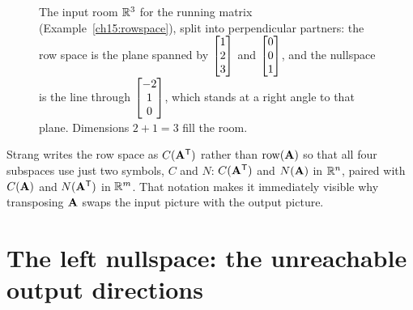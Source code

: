 \begin{figure}[htbp]
\centering
{}
\caption{The input room $\mathbb{R}^3$ for the running matrix
(Example~\ref{ch15:rowspace}), split into perpendicular partners: the row space is the plane
spanned by $\protect\begin{bmatrix}1\\2\\3\end{bmatrix}$ and $\protect\begin{bmatrix}0\\0\\1\end{bmatrix}$, and the nullspace is the line
through $\protect\begin{bmatrix}-2\\1\\0\end{bmatrix}$, which stands at a right angle to that plane. Dimensions
$2+1=3$ fill the room.}
\label{ch15:rowspace-null}
\end{figure}

\begin{strangbox}
Strang writes the row space as $C(\mathbf{A}^{\mathsf{T}})$ rather than $\operatorname{row}(\mathbf{A})$ so that all
four subspaces use just two symbols, $C$ and $N$: $C(\mathbf{A}^{\mathsf{T}})$ and $N(\mathbf{A})$ in
$\mathbb{R}^n$, paired with $C(\mathbf{A})$ and $N(\mathbf{A}^{\mathsf{T}})$ in $\mathbb{R}^m$. That notation makes it
immediately visible why transposing $\mathbf{A}$ swaps the input picture with the output
picture.
\end{strangbox}

\section{The left nullspace: the unreachable output directions}

